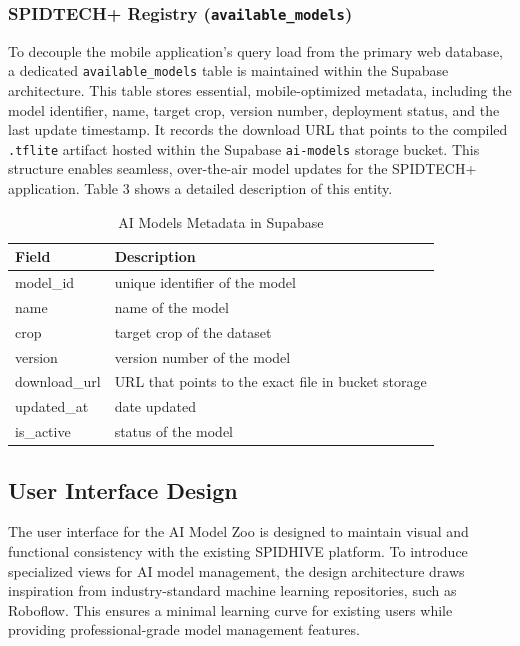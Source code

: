 \documentclass[journal]{./IEEE/IEEEtran}
\begin{document}
\subsubsection{SPIDTECH+ Registry (\texttt{available\_models})}
To decouple the mobile application's query load from the primary web database, a dedicated \texttt{available\_models} table is maintained within the Supabase architecture. This table stores essential, mobile-optimized metadata, including the model identifier, name, target crop, version number, deployment status, and the last update timestamp. It records the download URL that points to the compiled \texttt{.tflite} artifact hosted within the Supabase \texttt{ai-models} storage bucket. This structure enables seamless, over-the-air model updates for the SPIDTECH+ application. Table 3 shows a detailed description of this entity.

\begin{table}[htbp]
    \centering
    \caption{AI Models Metadata in Supabase}
    \label{tab:supabase_metadata}
    \begin{tabular}{p{} p{}}
        \toprule
        \textbf{Field}      & \textbf{Description} \\ 
        \midrule
        model\_id           & unique identifier of the model \\ 
        name                & name of the model\\
        crop                & target crop of the dataset \\ 
        version             & version number of the model\\ 
        download\_url       & URL that points to the exact file in bucket storage \\  
        updated\_at         & date updated \\
        is\_active          & status of the model\\
        \bottomrule
    \end{tabular}
\end{table}

\subsection{User Interface Design}
The user interface for the AI Model Zoo is designed to maintain visual and functional consistency with the existing SPIDHIVE platform. To introduce specialized views for AI model management, the design architecture draws inspiration from industry-standard machine learning repositories, such as Roboflow. This ensures a minimal learning curve for existing users while providing professional-grade model management features.
\end{document}
